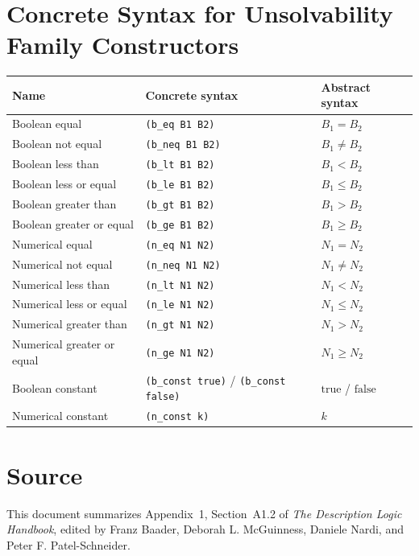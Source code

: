 \documentclass[11pt]{article}
\newenvironment{compacttable}
  {\begingroup\setlength{\tabcolsep}{3pt}}
  {\endgroup}
\begin{document}
\section{Concrete Syntax for Unsolvability Family Constructors}

\begin{compacttable}
\begin{longtable}{>{\raggedright\arraybackslash}p{}
                  >{\raggedright\arraybackslash}p{}
                  >{\raggedright\arraybackslash}p{}}
\toprule
Name & Concrete syntax & Abstract syntax \\
\midrule
\endhead
Boolean equal & \texttt{(b\_eq B1 B2)} & $B_1 = B_2$ \\
Boolean not equal & \texttt{(b\_neq B1 B2)} & $B_1 \neq B_2$ \\
Boolean less than & \texttt{(b\_lt B1 B2)} & $B_1 < B_2$ \\
Boolean less or equal & \texttt{(b\_le B1 B2)} & $B_1 \leq B_2$ \\
Boolean greater than & \texttt{(b\_gt B1 B2)} & $B_1 > B_2$ \\
Boolean greater or equal & \texttt{(b\_ge B1 B2)} & $B_1 \geq B_2$ \\
Numerical equal & \texttt{(n\_eq N1 N2)} & $N_1 = N_2$ \\
Numerical not equal & \texttt{(n\_neq N1 N2)} & $N_1 \neq N_2$ \\
Numerical less than & \texttt{(n\_lt N1 N2)} & $N_1 < N_2$ \\
Numerical less or equal & \texttt{(n\_le N1 N2)} & $N_1 \leq N_2$ \\
Numerical greater than & \texttt{(n\_gt N1 N2)} & $N_1 > N_2$ \\
Numerical greater or equal & \texttt{(n\_ge N1 N2)} & $N_1 \geq N_2$ \\
Boolean constant & \texttt{(b\_const true)} / \texttt{(b\_const false)} & $\mathrm{true}$ / $\mathrm{false}$ \\
Numerical constant & \texttt{(n\_const k)} & $k$ \\
\bottomrule
\end{longtable}
\end{compacttable}


\section*{Source}

This document summarizes Appendix~1, Section~A1.2 of
\emph{The Description Logic Handbook}, edited by Franz Baader,
Deborah L. McGuinness, Daniele Nardi, and Peter F. Patel-Schneider.
\end{document}
